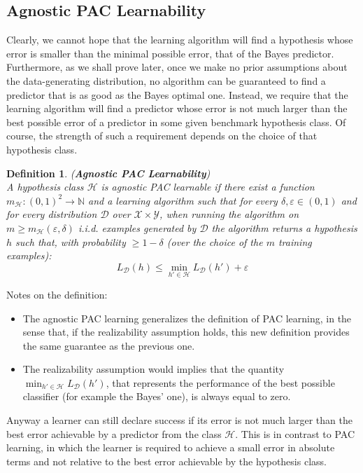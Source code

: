 \documentclass[12pt]{report}
\theoremstyle{plain}
\newtheorem{definition}{Definition}[chapter]
\newcommand\mcl[1]{\mathcal{#1}}
\begin{document}
\begin{flushleft}
\section{Agnostic PAC Learnability}
Clearly, we cannot hope that the learning algorithm will find a hypothesis whose error is smaller than the minimal possible error, that of the Bayes predictor. Furthermore, as we shall prove later, once we make no prior assumptions about the data-generating distribution, no algorithm can be guaranteed to find a predictor that is as good as the Bayes optimal one. Instead, we require that the learning algorithm will find a predictor whose error is not much larger than the best possible error of a predictor in some given benchmark hypothesis class. Of course, the strength of such a requirement depends on the choice of that hypothesis class.\\
\begin{definition}(\textbf{Agnostic PAC Learnability})\\
A hypothesis class $\mcl{H}$ is agnostic PAC learnable if there exist a function $m_\mcl{H}:(0,1)^2\to\mathds{N}$ and a learning algorithm such that for every $\delta,\varepsilon\in (0,1)$ and for every distribution $\mcl{D}$ over $\mcl{X}\times\mcl{Y}$, when running the algorithm on $m\geq m_\mcl{H}(\varepsilon,\delta)$ i.i.d. examples generated by $\mcl{D}$ the algorithm returns a hypothesis $h$ such that, with probability $\geq 1-\delta$ (over the choice of the $m$ training examples):
\[ L_\mcl{D}(h)\leq\min_{h'\in\mcl{H}}L_\mcl{D}(h')+\varepsilon \]
\label{def:agnostic_PAC_l}
\end{definition}
Notes on the definition:
\begin{itemize}
\item The agnostic PAC learning generalizes the definition of PAC learning, in the sense that, if the realizability assumption holds, this new definition provides the same guarantee as the previous one.
\item The realizability assumption would implies that the quantity $\min_{h'\in\mcl{H}}L_\mcl{D}(h')$, that represents the performance of the best possible classifier (for example the Bayes' one), is always equal to zero.
\end{itemize}
Anyway a learner can still declare success if its error is not much larger than the best error achievable by a predictor from the class $\mcl{H}$. This is in contrast to PAC learning, in which the learner is required to achieve a small error in absolute terms and not relative to the best error achievable by the hypothesis class.\\ 


\end{flushleft}
\end{document}
